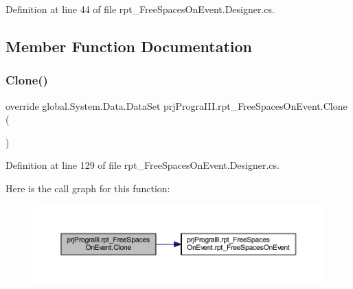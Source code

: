 Definition at line 44 of file rpt\+\_\+\+Free\+Spaces\+On\+Event.\+Designer.\+cs.



\subsection{Member Function Documentation}
\hypertarget{classprj_progra_i_i_i_1_1rpt___free_spaces_on_event_a16c4fb7bebced867e1fddf8dd41407d8}{}\label{classprj_progra_i_i_i_1_1rpt___free_spaces_on_event_a16c4fb7bebced867e1fddf8dd41407d8} 
\subsubsection{\texorpdfstring{Clone()}{Clone()}}
{\footnotesize\ttfamily override global.\+System.\+Data.\+Data\+Set prj\+Progra\+I\+I\+I.\+rpt\+\_\+\+Free\+Spaces\+On\+Event.\+Clone (\begin{DoxyParamCaption}{ }\end{DoxyParamCaption})}



Definition at line 129 of file rpt\+\_\+\+Free\+Spaces\+On\+Event.\+Designer.\+cs.

Here is the call graph for this function\+:
\nopagebreak
\begin{figure}[H]
\begin{center}
\leavevmode
\includegraphics[width=350pt]{classprj_progra_i_i_i_1_1rpt___free_spaces_on_event_a16c4fb7bebced867e1fddf8dd41407d8_cgraph}
\end{center}
\end{figure}
\hypertarget{classprj_progra_i_i_i_1_1rpt___free_spaces_on_event_a627cb3a651bf604cd4ed8d875454d820}{}\label{classprj_progra_i_i_i_1_1rpt___free_spaces_on_event_a627cb3a651bf604cd4ed8d875454d820} 
